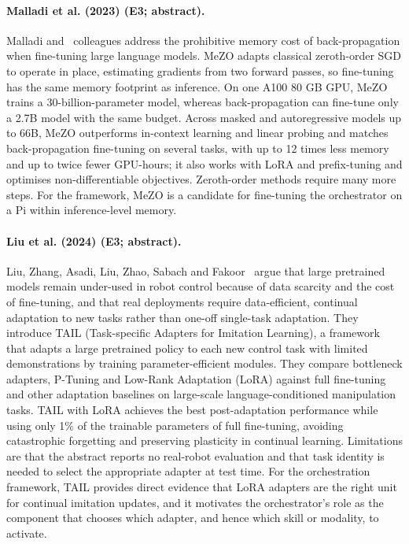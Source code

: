 \documentclass[10pt,a4paper]{article}
\begin{document}
\paragraph{Malladi et al. (2023) (E3; abstract).} Malladi and~\cite{Malladi2023} colleagues address the prohibitive memory cost of back-propagation when fine-tuning large language models. MeZO adapts classical zeroth-order SGD to operate in place, estimating gradients from two forward passes, so fine-tuning has the same memory footprint as inference. On one A100 80 GB GPU, MeZO trains a 30-billion-parameter model, whereas back-propagation can fine-tune only a 2.7B model with the same budget. Across masked and autoregressive models up to 66B, MeZO outperforms in-context learning and linear probing and matches back-propagation fine-tuning on several tasks, with up to 12 times less memory and up to twice fewer GPU-hours; it also works with LoRA and prefix-tuning and optimises non-differentiable objectives. Zeroth-order methods require many more steps. For the framework, MeZO is a candidate for fine-tuning the orchestrator on a Pi within inference-level memory.

\paragraph{Liu et al. (2024) (E3; abstract).} Liu, Zhang, Asadi, Liu, Zhao, Sabach and Fakoor~\cite{Liu2024b} argue that large pretrained models remain under-used in robot control because of data scarcity and the cost of fine-tuning, and that real deployments require data-efficient, continual adaptation to new tasks rather than one-off single-task adaptation. They introduce TAIL (Task-specific Adapters for Imitation Learning), a framework that adapts a large pretrained policy to each new control task with limited demonstrations by training parameter-efficient modules. They compare bottleneck adapters, P-Tuning and Low-Rank Adaptation (LoRA) against full fine-tuning and other adaptation baselines on large-scale language-conditioned manipulation tasks. TAIL with LoRA achieves the best post-adaptation performance while using only 1\% of the trainable parameters of full fine-tuning, avoiding catastrophic forgetting and preserving plasticity in continual learning. Limitations are that the abstract reports no real-robot evaluation and that task identity is needed to select the appropriate adapter at test time. For the orchestration framework, TAIL provides direct evidence that LoRA adapters are the right unit for continual imitation updates, and it motivates the orchestrator's role as the component that chooses which adapter, and hence which skill or modality, to activate.
\end{document}
